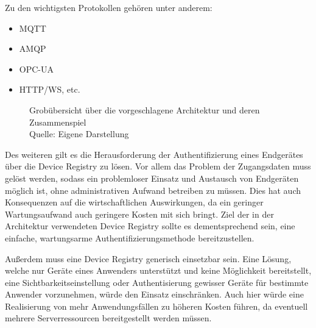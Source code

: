 \pagebreak
Zu den wichtigsten Protokollen gehören unter anderem:
\begin{itemize}
    \item MQTT
    \item AMQP
    \item OPC-UA
    \item \ac{HTTP}/WS, etc.
\end{itemize}

\begin{figure}
    \centering
    \caption{Grobübersicht über die vorgeschlagene Architektur und deren Zusammenspiel\\ Quelle: Eigene Darstellung}
    \label{fig:high_level}
\end{figure}

Des weiteren gilt es die Herausforderung der Authentifizierung eines Endgerätes über die Device Registry zu lösen. Vor allem das Problem der Zugangsdaten muss gelöst werden, sodass ein problemloser Einsatz und Austausch von Endgeräten möglich ist, ohne administrativen Aufwand betreiben zu müssen. Dies hat auch Konsequenzen auf die wirtschaftlichen Auswirkungen, da ein geringer Wartungsaufwand auch geringere Kosten mit sich bringt. Ziel der in der Architektur verwendeten Device Registry sollte es dementsprechend sein, eine einfache, wartungsarme Authentifizierungsmethode bereitzustellen.

Außerdem muss eine Device Registry generisch einsetzbar sein. Eine Lösung, welche nur Geräte eines Anwenders unterstützt und keine Möglichkeit bereitstellt, eine Sichtbarkeitseinstellung oder Authentisierung gewisser Geräte für bestimmte Anwender vorzunehmen, würde den Einsatz einschränken. Auch hier würde eine Realisierung von mehr Anwendungsfällen zu höheren Kosten führen, da eventuell mehrere Serverressourcen bereitgestellt werden müssen.

